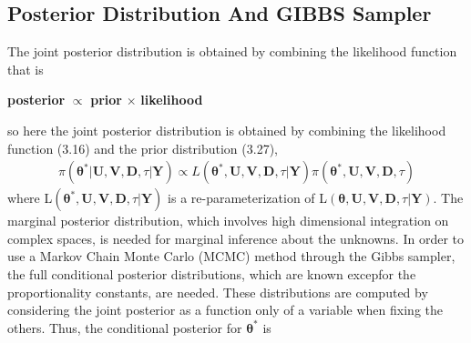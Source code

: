 \subsection{Posterior Distribution And GIBBS Sampler}
The joint posterior distribution is obtained by combining the likelihood function that is
\begin{center}
	\textbf{posterior} $\varpropto$ \textbf{prior} $\times$ \textbf{likelihood}
\end{center}
so here the joint posterior distribution is obtained by combining the likelihood function (3.16) and the prior distribution (3.27),
\begin{eqnarray}
	\pi(\bm{\theta}^*|\textbf{U},\textbf{V},\textbf{D},\tau|\textbf{Y}) \varpropto L(\bm{\theta}^*,\textbf{U},\textbf{V},\textbf{D},\tau|\textbf{Y})\pi(\bm{\theta}^*,\textbf{U},\textbf{V},\textbf{D},\tau) \nonumber
\end{eqnarray}
where L$(\bm{\theta}^*,\textbf{U},\textbf{V},\textbf{D},\tau|\textbf{Y})$ is a re-parameterization of L$(\bm{\theta},\textbf{U},\textbf{V},\textbf{D},\tau|\textbf{Y})$. The marginal posterior distribution, which involves high dimensional integration on complex spaces, is needed for marginal inference about the unknowns. In order to use a Markov Chain Monte Carlo (MCMC) method through the Gibbs sampler, the full conditional posterior distributions, which are known excepfor the proportionality constants, are needed. These distributions are computed by considering the joint posterior as a function only of a variable when fixing the others. Thus, the conditional posterior for $\bm{\theta}^*$ is

